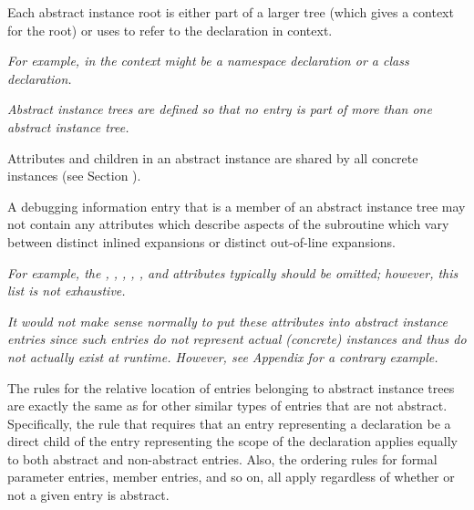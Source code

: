 Each abstract instance root is either part of a larger
tree (which gives a context for the root) or
uses
\DWATspecification{}
to refer to the declaration in context.

\textit{For example, in  the context might be a namespace
declaration or a class declaration.}

\textit{Abstract instance trees are defined so that no entry is part
of more than one abstract instance tree.}

Attributes and children in an abstract instance are shared
by all concrete instances (see Section ).

A debugging information entry that is a member of an abstract
instance tree may not contain any attributes which describe
aspects of the subroutine which vary between distinct inlined
expansions or distinct out-of-line expansions.

\textit{For example,
the \DWATlowpc,
\DWAThighpc,
\DWATranges,
\DWATentrypc,
\DWATlocation,
\bb
\DWATreturnaddr{}
and
\DWATstartscope{}
\eb
attributes typically should be omitted; however, this list is not
exhaustive.}

\textit{It would not make sense normally to put these attributes into
abstract instance entries since such entries do not represent
actual (concrete) instances and thus do not actually exist at
run\dash time.  However,
see Appendix 
for a contrary example.}

The rules for the relative location of entries belonging to
abstract instance trees are exactly the same as for other
similar types of entries that are not abstract. Specifically,
the rule that requires that an entry representing a declaration
be a direct child of the entry representing the scope of the
declaration applies equally to both abstract and non-abstract
entries. Also, the ordering rules for formal parameter entries,
member entries, and so on, all apply regardless of whether
or not a given entry is abstract.

